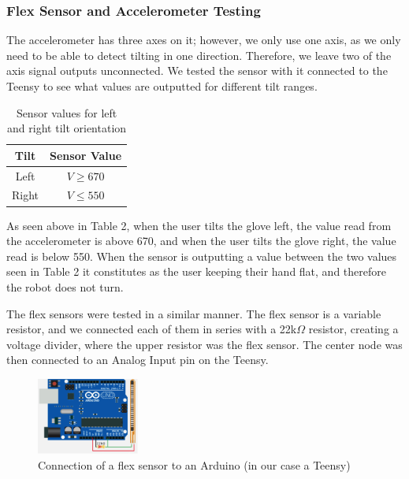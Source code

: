 \documentclass[12pt,scrartcl,titlepage]{article}
\begin{document}
  \subsubsection{Flex Sensor and Accelerometer Testing}

  The accelerometer has three axes on it; however, we only use one axis, as we only need to be able to detect tilting in one direction. Therefore, we leave two of the axis signal outputs unconnected. We tested the sensor with it connected to the Teensy to see what values are outputted for different tilt ranges.
  \begin{table}[h!]
    \begin{center}
      \begin{tabular}{|c|c|}
        \hline
        \textbf{Tilt}&\textbf{Sensor Value}\\
        \hline
        Left&$V \geq 670$\\
        \hline
        Right&$V \leq 550$\\
        \hline
      \end{tabular}
    \end{center}
    \caption{Sensor values for left and right tilt orientation}
  \end{table}

As seen above in Table 2, when the user tilts the glove left, the value read from the accelerometer is above 670, and when the user tilts the glove right, the value read is below 550. When the sensor is outputting a value between the two values seen in Table 2 it constitutes as the user keeping their hand flat, and therefore the robot does not turn.

The flex sensors were tested in a similar manner. The flex sensor is a variable resistor, and we connected each of them in series with a 22k$\Omega$ resistor, creating a voltage divider, where the upper resistor was the flex sensor. The center node was then connected to an Analog Input pin on the Teensy.

  \begin{figure}[h!]
    \centering
    \includegraphics[width=0.3\textwidth]{flex.png}
    \caption{Connection of a flex sensor to an Arduino (in our case a Teensy)}
  \end{figure}
\end{document}
